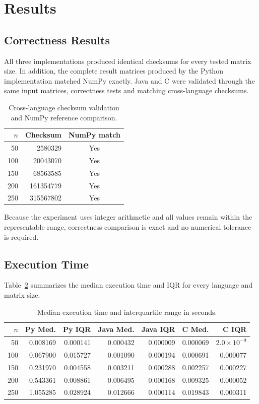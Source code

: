 \documentclass[11pt,a4paper]{article}
\begin{document}
\section{Results}

\subsection{Correctness Results}

All three implementations produced identical checksums for every tested matrix size. In addition, the complete result matrices produced by the Python implementation matched NumPy exactly. Java and C were validated through the same input matrices, correctness tests and matching cross-language checksums.

\begin{table}[H]
\centering
\caption{Cross-language checksum validation and NumPy reference comparison.}
\label{tab:correctness}
\begin{tabular}{rrc}
\toprule
$n$ & Checksum & NumPy match \\
\midrule
50  & 2580329   & Yes \\
100 & 20043070  & Yes \\
150 & 68563585  & Yes \\
200 & 161354779 & Yes \\
250 & 315567802 & Yes \\
\bottomrule
\end{tabular}
\end{table}

Because the experiment uses integer arithmetic and all values remain within the representable range, correctness comparison is exact and no numerical tolerance is required.
\subsection{Execution Time}

Table~\ref{tab:runtime} summarizes the median execution time and IQR for every language and matrix size.

\begin{table}[H]
\centering
\caption{Median execution time and interquartile range in seconds.}
\label{tab:runtime}
\begin{tabular}{rrrrrrr}
\toprule
$n$ & Py Med. & Py IQR & Java Med. & Java IQR & C Med. & C IQR \\
\midrule
50  & 0.008169 & 0.000141 & 0.000432 & 0.000009 & 0.000069 & $2.0\times10^{-9}$ \\
100 & 0.067900 & 0.015727 & 0.001090 & 0.000194 & 0.000691 & 0.000077 \\
150 & 0.231970 & 0.004558 & 0.003211 & 0.000288 & 0.002257 & 0.000227 \\
200 & 0.543361 & 0.008861 & 0.006495 & 0.000168 & 0.009325 & 0.000052 \\
250 & 1.055285 & 0.028924 & 0.012666 & 0.000114 & 0.019843 & 0.000311 \\
\bottomrule
\end{tabular}
\end{table}
\end{document}
